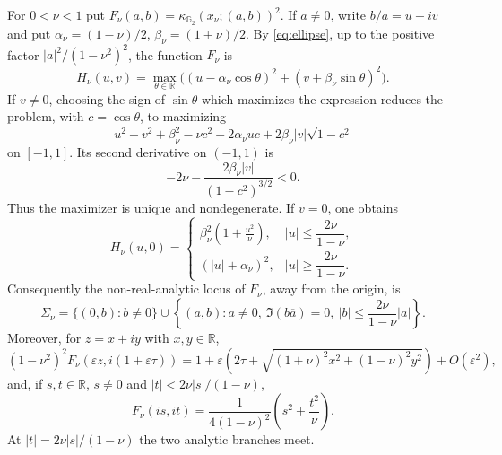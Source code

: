 \documentclass[12pt]{amsart}
\newcommand{\RR}{\mathbb R}
\newcommand{\GG}{\mathbb G_2}
\begin{document}
For $0<\nu<1$ put $F_\nu(a,b)=\kappa_{\GG}(x_\nu;(a,b))^2$. If $a\ne0$, write
$b/a=u+iv$ and put $\alpha_\nu=(1-\nu)/2$, $\beta_\nu=(1+\nu)/2$. By
\eqref{eq:ellipse}, up to the positive factor $|a|^2/(1-\nu^2)^2$, the function
$F_\nu$ is
\[
 H_\nu(u,v)=\max_{\theta\in\RR}
 \bigl((u-\alpha_\nu\cos\theta)^2+(v+\beta_\nu\sin\theta)^2\bigr).
\]
If $v\ne0$, choosing the sign of $\sin\theta$ which maximizes the expression
reduces the problem, with $c=\cos\theta$, to maximizing
\[
 u^2+v^2+\beta_\nu^2-\nu c^2-2\alpha_\nu u c
 +2\beta_\nu|v|\sqrt{1-c^2}
\]
on $[-1,1]$. Its second derivative on $(-1,1)$ is
\[
 -2\nu-\frac{2\beta_\nu|v|}{(1-c^2)^{3/2}}<0.
\]
Thus the maximizer is unique and nondegenerate. If $v=0$, one obtains
\[
 H_\nu(u,0)=
 \begin{cases}
 \displaystyle \beta_\nu^2\left(1+\frac{u^2}{\nu}\right),
 & |u|\le \dfrac{2\nu}{1-\nu},\\[5pt]
 \displaystyle (|u|+\alpha_\nu)^2,
 & |u|\ge \dfrac{2\nu}{1-\nu}.
 \end{cases}
\]
Consequently the non-real-analytic locus of $F_\nu$, away from the origin, is
\begin{equation}\label{eq:Sigma}
\Sigma_\nu
=
\{(0,b):b\ne0\}
\cup
\left\{
(a,b):a\ne0,
\ \Im(b\overline a)=0,
\ |b|\le\frac{2\nu}{1-\nu}|a|
\right\}.
\end{equation}
Moreover, for $z=x+iy$ with $x,y\in\RR$,
\begin{equation}\label{eq:vertical-first-variation}
(1-\nu^2)^2
F_\nu(\varepsilon z,i(1+\varepsilon\tau))
=
1+\varepsilon
\left(
2\tau+
\sqrt{(1+\nu)^2x^2+(1-\nu)^2y^2}
\right)
+O(\varepsilon^2),
\end{equation}
and, if $s,t\in\RR$, $s\ne0$ and $|t|<2\nu|s|/(1-\nu)$,
\begin{equation}\label{eq:wedge-quadratic}
F_\nu(is,it)
=
\frac1{4(1-\nu)^2}
\left(s^2+\frac{t^2}{\nu}\right).
\end{equation}
At $|t|=2\nu|s|/(1-\nu)$ the two analytic branches meet.
\end{document}
